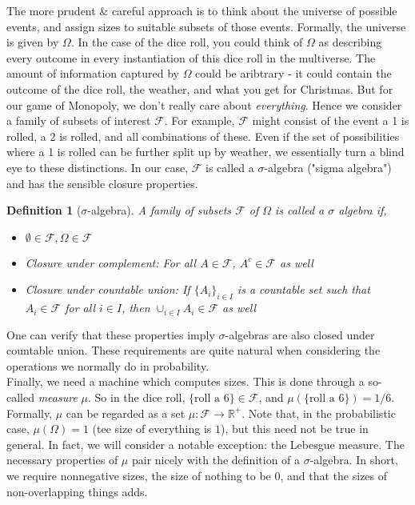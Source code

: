 \documentclass{report}
\newcommand{\F}{\mathcal F}
\newtheorem{definition}{Definition}
\begin{document}
The more prudent \& careful approach is to think about the universe of possible events, and assign
sizes to suitable subsets of those events. Formally, the universe is given by $\Omega$. In the case of the dice 
roll, you could think of $\Omega$ as describing every outcome in every instantiation of this dice roll in the 
multiverse. The amount of information captured by $\Omega$ could be aribtrary - it could contain the outcome of the 
dice roll, the weather, and what you get for Christmas. But for our game of Monopoly, we don't really care 
about \emph{everything}. Hence we consider a family of subsets of interest $\F$. For example, $\F$ might consist of 
the event a 1 is rolled, a 2 is rolled, and all combinations of these. Even if the set of possibilities where a 1 is rolled 
can be further split up by weather, we essentially turn a blind eye to these distinctions. In our case, 
$\F$ is called a $\sigma$-algebra ("sigma algebra") and has the sensible closure properties. 

\begin{definition}[$\sigma$-algebra] \label{def:sigma algebra} A family of subsets $\F$ of $\Omega$ is called a $\sigma$ algebra if,
\begin{itemize}
    \item $\emptyset \in \F, \Omega \in \F$
    \item Closure under complement: For all $A \in \F$, $A^c \in \F$ as well
    \item Closure under countable union: If $\{A_i\}_{i \in I}$ is a countable set such that $A_i \in \F$ for all $i \in I$, then 
        $\cup_{i \in I}A_i \in \F$ as well
\end{itemize}
\end{definition}

One can verify that these properties imply $\sigma$-algebras are also closed under countable union. These 
requirements are quite natural when considering the operations we normally do in probability.\\

Finally, we need a 
machine which computes sizes. This is done through a so-called \emph{measure} $\mu$. 
So in the dice roll, $\{\text{roll a 6}\} \in \F$, and $\mu(\{\text{roll a 6}\}) = 1/6$.
Formally, $\mu$ can be 
regarded as a set $\mu : \F \to \mathbb R^+$. Note that, in the probabilistic case, 
$\mu(\Omega) = 1$ (tee size of everything is $1$), but this need not be true in general. In fact, we 
will consider a notable exception: the Lebesgue measure. The necessary properties of 
$\mu$ pair nicely with the definition of a $\sigma$-algebra. In short, we require nonnegative 
sizes, the size of nothing to be $0$, and that the sizes of non-overlapping things adds.
\end{document}
